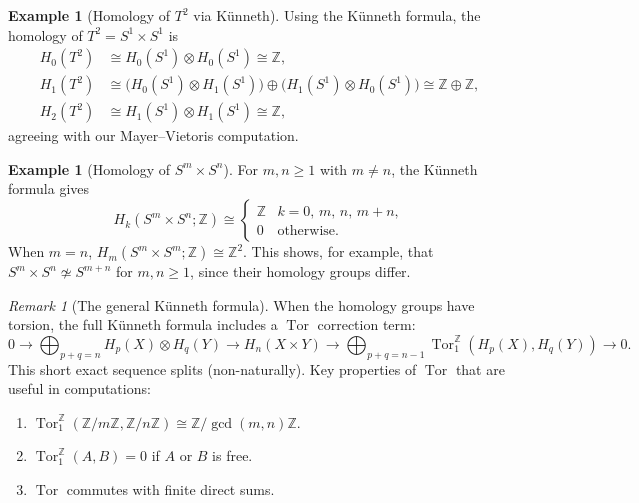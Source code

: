 \documentclass[12pt,a4paper,openany]{book}
\theoremstyle{definition}
\newtheorem{example}[definition]{Example}
\theoremstyle{plain}
\theoremstyle{remark}
\newtheorem{remark}[definition]{Remark}
\newcommand{\Z}{\mathbb{Z}}
\begin{document}
\begin{example}[Homology of $T^2$ via K\"unneth]
Using the K\"unneth formula, the homology of $T^2=S^1\times S^1$ is
\begin{align*}
  H_0(T^2) &\cong H_0(S^1)\otimes H_0(S^1) \cong \Z,\\
  H_1(T^2) &\cong \bigl(H_0(S^1)\otimes H_1(S^1)\bigr)
             \oplus\bigl(H_1(S^1)\otimes H_0(S^1)\bigr)
             \cong \Z\oplus\Z,\\
  H_2(T^2) &\cong H_1(S^1)\otimes H_1(S^1) \cong \Z,
\end{align*}
agreeing with our Mayer--Vietoris computation.
\end{example}

\begin{example}[Homology of $S^m\times S^n$]
For $m,n\geq 1$ with $m\neq n$, the K\"unneth formula gives
\[
  H_k(S^m\times S^n;\Z) \cong
  \begin{cases}
    \Z & k=0,\,m,\,n,\,m+n,\\
    0  & \text{otherwise.}
  \end{cases}
\]
When $m=n$, $H_m(S^m\times S^m;\Z)\cong\Z^2$.
This shows, for example, that $S^m\times S^n\not\simeq S^{m+n}$ for
$m,n\geq 1$, since their homology groups differ.
\end{example}

\begin{remark}[The general K\"unneth formula]
When the homology groups have torsion, the full K\"unneth formula
includes a $\operatorname{Tor}$ correction term:
\[
  0 \to \bigoplus_{p+q=n} H_p(X)\otimes H_q(Y) \to H_n(X\times Y)
    \to \bigoplus_{p+q=n-1}\operatorname{Tor}_1^\Z(H_p(X),H_q(Y)) \to 0.
\]
This short exact sequence splits (non-naturally). Key properties of
$\operatorname{Tor}$ that are useful in computations:
\begin{enumerate}[label=(\roman*)]
  \item $\operatorname{Tor}_1^\Z(\Z/m\Z,\Z/n\Z)\cong\Z/\gcd(m,n)\Z$.
  \item $\operatorname{Tor}_1^\Z(A,B)=0$ if $A$ or $B$ is free.
  \item $\operatorname{Tor}$ commutes with finite direct sums.
\end{enumerate}
\end{remark}
\end{document}
